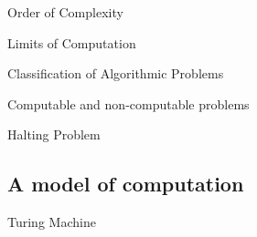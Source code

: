   
  
  \noindent
  Order of Complexity
  
  \noindent
  Limits of Computation
  
  \noindent
  Classification of Algorithmic Problems
  
  \noindent
  Computable and non-computable problems
  
  \noindent
  Halting Problem

\subsection{A model of computation}
  \noindent
  Turing Machine